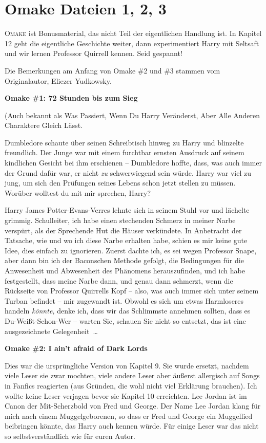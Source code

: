 \chapter{Omake Dateien 1, 2, 3}

\lettrine{\loq O}{make} ist Bonusmaterial, das nicht Teil der eigentlichen
Handlung ist. In Kapitel 12 geht die eigentliche Geschichte weiter, dann
experimentiert Harry mit Seltsaft und wir lernen Professor Quirrell kennen. Seid
gespannt!

Die Bemerkungen am Anfang von Omake \#2 und \#3 stammen vom Originalautor,
Eliezer Yudkowsky.

\textbf{Omake \#1: 72 Stunden bis zum Sieg}

(Auch bekannt als \glqq{}Was Passiert, Wenn Du Harry Veränderst, Aber Alle
Anderen Charaktere Gleich Lässt\grqq{}.

Dumbledore schaute über seinen Schreibtisch hinweg zu Harry und blinzelte
freundlich. Der Junge war mit einem furchtbar ernsten Ausdruck auf seinem
kindlichen Gesicht bei ihm erschienen – Dumbledore hoffte, dass, was auch immer
der Grund dafür war, er nicht \emph{zu} schwerwiegend sein würde. Harry war viel
zu jung, um sich den Prüfungen seines Lebens schon jetzt stellen zu müssen.
\glqq{}Worüber wolltest du mit mir sprechen, Harry?\grqq{}

Harry James Potter-Evans-Verres lehnte sich in seinem Stuhl vor und lächelte
grimmig. \glqq{}Schulleiter, ich habe einen stechenden Schmerz in meiner Narbe
verspürt, als der Sprechende Hut die Häuser verkündete. In Anbetracht der
Tatsache, wie und wo ich diese Narbe erhalten habe, schien es mir keine gute
Idee, dies einfach zu ignorieren. Zuerst dachte ich, es sei wegen Professor
Snape, aber dann bin ich der Baconschen Methode gefolgt, die Bedingungen für die
Anwesenheit und Abwesenheit des Phänomens herauszufinden, und ich habe
festgestellt, dass meine Narbe dann, und genau dann schmerzt, wenn die Rückseite
von Professor Quirrells Kopf – also, was auch immer sich unter seinem Turban
befindet – mir zugewandt ist. Obwohl es sich um etwas Harmloseres handeln
\emph{könnte,} denke ich, dass wir das Schlimmste annehmen sollten, dass es
Du-Weißt-Schon-Wer – warten Sie, schauen Sie nicht so entsetzt, das ist eine
ausgezeichnete Gelegenheit …\grqq{}

\textbf{Omake \#2: I ain't afraid of Dark Lords}

Dies war die ursprüngliche Version von Kapitel 9. Sie wurde ersetzt, nachdem
viele Leser sie zwar mochten, viele andere Leser aber äußerst allergisch auf
Songs in Fanfics reagierten (aus Gründen, die wohl nicht viel Erklärung
brauchen). Ich wollte keine Leser verjagen bevor sie Kapitel 10 erreichten. Lee
Jordan ist im Canon der Mit-Scherzbold von Fred und George. Der Name \grqq{} Lee
Jordan\grqq{} klang für mich nach einem Muggelgeborenen, so dass er Fred und
George ein Muggellied beibringen könnte, das Harry auch kennen würde. Für einige
Leser war das nicht so selbstverständlich wie für euren Autor.

